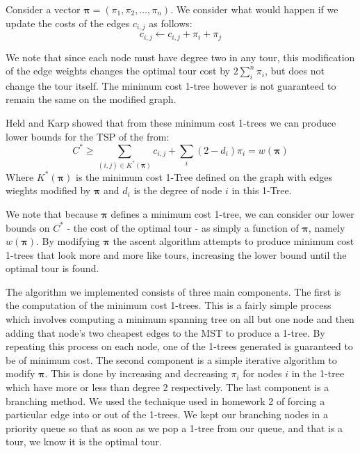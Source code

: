 \documentclass[11pt]{article}
\newcommand{\ve}[1]{\boldsymbol{#1}}
\begin{document}
	Consider a vector $\ve{\pi} = (\pi_1, \pi_2, \dots, \pi_n)$. We consider what would happen if we update the costs of the edges $c_{i,j}$ as follows:
	$$ c_{i,j} \leftarrow c_{i,j} + \pi_i + \pi_j $$
	
	We note that since each node must have degree two in any tour, this modification of the edge weights changes the optimal tour cost by $2 \sum\limits_i^n \pi_i$, but does not change the tour itself. The minimum cost 1-tree however is not guaranteed to remain the same on the modified graph.
	
	Held and Karp showed that from these minimum cost 1-trees we can produce lower bounds for the TSP of the from:
	\[ C^* \geq \sum\limits_{(i,j) \in K^*(\ve{\pi})} c_{i,j} + \sum\limits_i (2 - d_i)\pi_i = w(\ve{\pi}) \]
	Where $ K^*(\ve{\pi})$ is the minimum cost 1-Tree defined on the graph with edges wieghts modified by $\ve{\pi}$ and $d_i$ is the degree of node $i$ in this 1-Tree. 
	
	We note that because $\ve{\pi}$ defines a minimum cost 1-tree, we can consider our lower bounds on $C^*$ - the cost of the optimal tour - as simply a function of $\ve{\pi}$, namely $w(\ve{\pi})$. By modifying $\ve{\pi}$ the ascent algorithm attempts to produce minimum cost 1-trees that look more and more like tours, increasing the lower bound until the optimal tour is found.
	
	The algorithm we implemented consists of three main components. The first is the computation of the minimum cost 1-trees. This is a fairly simple process which involves computing a minimum spanning tree on all but one node and then adding that node's two cheapest edges to the MST to produce a 1-tree. By repeating this process on each node, one of the 1-trees generated is guaranteed to be of minimum cost. The second component is a simple iterative algorithm to modify $\ve{\pi}$. This is done by increasing and decreasing $\pi_i$ for nodes $i$ in the 1-tree which have more or less than degree 2 respectively. The last component is a branching method. We used the technique used in homework 2 of forcing a particular edge into or out of the 1-trees. We kept our branching nodes in a priority queue so that as soon as we pop a 1-tree from our queue, and that is a tour, we know it is the optimal tour.
	
\end{document}
